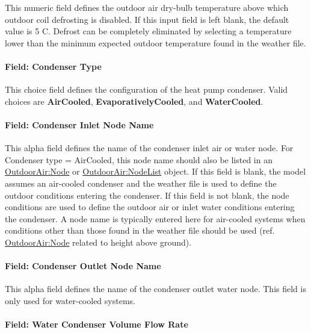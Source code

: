 This numeric field defines the outdoor air dry-bulb temperature above which outdoor coil defrosting is disabled. If this input field is left blank, the default value is 5 C. Defrost can be completely eliminated by selecting a temperature lower than the minimum expected outdoor temperature found in the weather file.

\paragraph{Field: Condenser Type}\label{field-condenser-type-003}

This choice field defines the configuration of the heat pump condenser. Valid choices are \textbf{AirCooled}, \textbf{EvaporativelyCooled}, and \textbf{WaterCooled}.

\paragraph{Field: Condenser Inlet Node Name}\label{field-condenser-inlet-node-name-000}

This alpha field defines the name of the condenser inlet air or water node. For Condenser type = AirCooled, this node name should also be listed in an \hyperref[outdoorairnode]{OutdoorAir:Node} or \hyperref[outdoorairnodelist]{OutdoorAir:NodeList} object. If this field is blank, the model assumes an air-cooled condenser and the weather file is used to define the outdoor conditions entering the condenser. If this field is not blank, the node conditions are used to define the outdoor air or inlet water conditions entering the condenser. A node name is typically entered here for air-cooled systems when conditions other than those found in the weather file should be used (ref. \hyperref[outdoorairnode]{OutdoorAir:Node} related to height above ground).

\paragraph{Field: Condenser Outlet Node Name}\label{field-condenser-outlet-node-name-000}

This alpha field defines the name of the condenser outlet water node. This field is only used for water-cooled systems.

\paragraph{Field: Water Condenser Volume Flow Rate}\label{field-water-condenser-volume-flow-rate-000}

